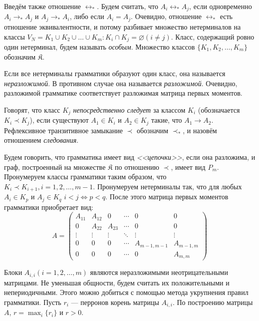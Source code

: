 \documentclass[11pt]{article}
\begin{document}
Введём также отношение $\leftrightarrow_*$. Будем считать, что $A_i \leftrightarrow_* A_j$, если одновременно $A_i \rightarrow_* A_j$ и $A_j \rightarrow_* A_i$, либо если $A_i = A_j$. Очевидно, отношение $\leftrightarrow_*$ есть отношение эквивалентности, и потому разбивает множество нетерминалов на классы $V_N = K_1 \cup K_2 \cup \ldots \cup K_m : K_i \cap K_j = \varnothing (i \neq j)$. Класс, содержащий ровно один нетерминал, будем называть \textit{особым}. Множество классов $\{K_1, K_2, \ldots, K_m\}$ обозначим $\mathfrak{K}$.

Если все нетерминалы грамматики образуют один класс, она называется \textit{неразложимой}. В противном случае она называется \textit{разложимой}. Очевидно, разложимой грамматике соответствует разложимая матрица первых моментов.

Говорят, что класс $K_j$ \textit{непосредственно следует} за классом $K_i$ (обозначается $K_i \prec K_j$), если существуют $A_1 \in K_i$ и $A_2 \in K_j$ такие, что $A_1 \rightarrow A_2$. Рефлексивное транзитивное замыкание $\prec$ обозначим $\prec_*$, и назовём отношением \textit{следования}.

Будем говорить, что грамматика имеет вид \textit{<<цепочки>>}, если она разложима, и граф, построенный на множестве $\mathfrak{K}$ по отношению $\prec$, имеет вид $P_m$. Пронумеруем классы грамматики таким образом, что $K_i \prec K_{i+1}, i = 1,2,\ldots,m-1$. Пронумеруем нетерминалы так, что для любых $A_i \in K_p$ и $A_j \in K_q$ $i < j \Leftrightarrow p < q$. После этого матрица первых моментов грамматики приобретает вид:
\begin{equation}
    A = 
    \begin{pmatrix}
        A_{11} & A_{12} & 0 & \cdots & 0 & 0 \\
        0 & A_{22} & A_{23} & \cdots & 0 & 0 \\
        \vdots & \vdots & \vdots & \ddots & \vdots & \vdots \\
        0 & 0 & 0 & \cdots & A_{m-1,m-1} & A_{m-1,m} \\
        0 & 0 & 0 & \cdots & 0 & A_{m,m}
    \end{pmatrix}
\end{equation}

Блоки $A_{i,i} (i = 1,2,\ldots,m)$ являются неразложимыми неотрицательными матрицами. Не уменьшая общности, будем считать их положительными и непериодичными. Этого можно добиться с помощью метода укрупнения правил грамматики. Пусть $r_i$ --- перронов корень матрицы $A_{i,i}$. По построению матрицы $A$, $r = \max_i \{r_i\}$ и $r > 0$.
\end{document}
